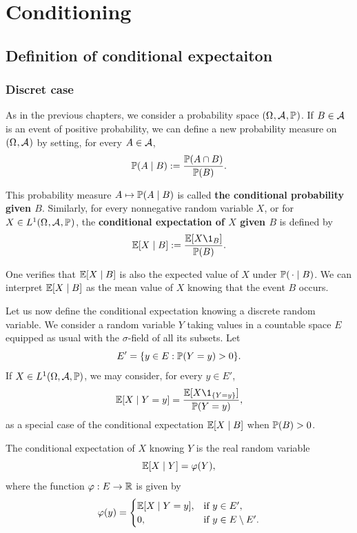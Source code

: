 \documentclass[../Main.tex]{subfiles}
\begin{document}
\section{Conditioning}

\subsection{Definition of conditional expectaiton} 
\subsubsection{Discret case}
As in the previous chapters, we consider a probability space $(\Omega_{}, \mathcal{A}_{}, \mathbb{P}_{})$. If $B \in \mathcal{A}$ is an event of positive probability,
we can define a new probability measure on $(\Omega_{}, \mathcal{A}_{})$ by setting, for every $A \in \mathcal{A}$, \[ \mathbb{P}(A \mid B) := \frac{\mathbb{P}(A \cap B)}{\mathbb{P}(B)}. \]

This probability measure $A \mapsto \mathbb{P}(A \mid B)$ is called \textbf{the conditional probability given $B$}. Similarly, for every nonnegative random variable $X$, or for $X \in L^{1}(\Omega_{}, \mathcal{A}_{}, \mathbb{P}_{})$,
the \textbf{conditional expectation of $X$ given $B$} is defined by
\[ \EE[X \mid B] := \frac{\EE[X \1_B]}{\PP(B)}. \]

One verifies that $\mathbb{E}[X \mid B]$ is also the expected value of $X$ under $\mathbb{P}(\,\cdot \mid B)$.
We can interpret $\mathbb{E}[X \mid B]$ as the mean value of $X$ knowing that the event $B$ occurs.

Let us now define the conditional expectation knowing a discrete random variable.
We consider a random variable $Y$ taking values in a countable space $E$ equipped as usual
with the $\sigma$-field of all its subsets.
Let
\[ E' = \{ y \in E : \mathbb{P}(Y = y) > 0 \}. \]
If $X \in L^{1}(\Omega, \mathcal{A}, \mathbb{P})$, we may consider, for every $y \in E'$,
\[ \EE[X \mid Y = y] = \frac{\EE[X \1_{\{Y=y\}}]}{\PP(Y = y)}, \]
as a special case of the conditional expectation $\mathbb{E}[X \mid B]$ when $\mathbb{P}(B) > 0$.

The conditional expectation of $X$ knowing $Y$ is the real random variable
\[\mathbb{E}[X \mid Y] = \varphi(Y),\]
where the function $\varphi : E \to \mathbb{R}$ is given by
\[\varphi(y) =
\begin{cases}
\mathbb{E}[X \mid Y = y], & \text{if } y \in E',\\
0, & \text{if } y \in E \setminus E'.
\end{cases} \]
\end{document}
